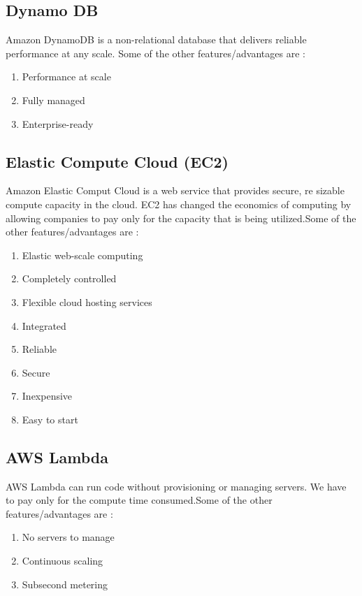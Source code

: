 \documentclass[journal]{hybrid-cloud}
\begin{document}
\subsection{Dynamo DB} 
Amazon DynamoDB is a non-relational database that delivers reliable performance at any scale. Some of the other features/advantages are :

\begin{enumerate}
	\item Performance at scale
	\item Fully managed
	\item Enterprise-ready
\end{enumerate}

\subsection{Elastic Compute Cloud (EC2)} 
Amazon Elastic Comput Cloud is a web service that provides secure, re sizable compute capacity in the cloud. EC2 has changed the economics of computing by allowing companies to pay only for the capacity that is being utilized.Some of the other features/advantages are :

\begin{enumerate}
	\item Elastic web-scale computing
	\item Completely controlled
	\item Flexible cloud hosting services
	\item Integrated
	\item Reliable
	\item Secure
	\item Inexpensive
	\item Easy to start
\end{enumerate}

\subsection{AWS Lambda} 
AWS Lambda can run code without provisioning or managing servers. We have to pay only for the compute time consumed.Some of the other features/advantages are :

\begin{enumerate}
	\item No servers to manage
	\item Continuous scaling
	\item Subsecond metering
\end{enumerate}
\end{document}
